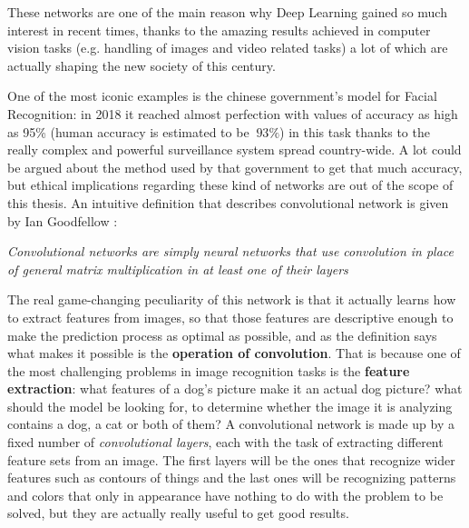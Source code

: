 \documentclass[11pt,a4paper,titlepage]{book}
\begin{document}
These networks are one of the main reason why Deep Learning gained so much interest in recent times, thanks to the amazing results achieved in computer vision tasks (e.g. handling of images and video related tasks) a lot of which are actually shaping the new society of this century.

One of the most iconic examples is the chinese government's model for Facial Recognition:  in 2018 it reached almost perfection with values of accuracy as high as 95\% (human accuracy is estimated to be $~93\%$) in this task thanks to the really complex and powerful surveillance system spread country-wide. A lot could be argued about the method used by that government to get that much accuracy, but ethical implications regarding these kind of networks are out of the scope of this thesis.
\newline
\newline
An intuitive definition that describes convolutional network is given by Ian Goodfellow \cite{Goodfellow1}: 
\begin{center}
    \textit{Convolutional networks are simply neural networks that use convolution in place of general matrix multiplication in at least one of their layers}
\end{center}
The real game-changing peculiarity of this network is that it actually learns how to extract features from images, so that those features are descriptive enough to make the prediction process as optimal as possible, and as the definition says what makes it possible is the \textbf{operation of convolution}.
\newline
That is because one of the most challenging problems in image recognition tasks is the \textbf{feature extraction}: what features of a dog's picture make it an actual dog picture? what should the model be looking for, to determine whether the image it is analyzing contains a dog, a cat or both of them?
\newline
\newline
A convolutional network is made up by a fixed number of \textit{convolutional layers}, each with the task of extracting different feature sets from an image. The first layers will be the ones that recognize wider features such as contours of things and the last ones will be recognizing patterns and colors that only in appearance have nothing to do with the problem to be solved, but they are actually really useful to get good results.
\end{document}
